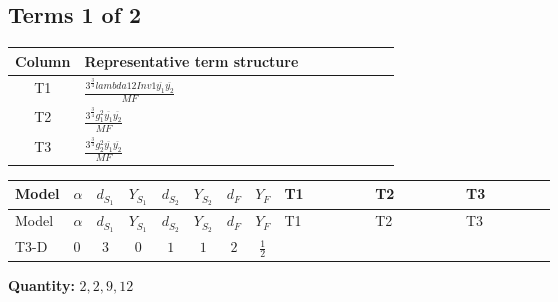 \documentclass[8pt]{article}
\begin{document}
\begin{landscape}
\subsection*{Terms 1 of 2}
\begin{center}
\begin{tabular}{@{}c >{\raggedright\arraybackslash}p{0.82\linewidth}@{}}
\toprule
Column & Representative term structure \\
\midrule
T1 & \(\displaystyle \frac{3^{\frac{3}{4}} lambda12Inv1 \overline{y_{1}} \overline{y_{2}}}{MF}\) \\
\midrule
T2 & \(\displaystyle \frac{3^{\frac{3}{4}} g_{1}^{2} \overline{y_{1}} \overline{y_{2}}}{MF}\) \\
\midrule
T3 & \(\displaystyle \frac{3^{\frac{3}{4}} g_{2}^{2} \overline{y_{1}} \overline{y_{2}}}{MF}\) \\
\midrule
\bottomrule
\end{tabular}
\end{center}
\smallskip
\tiny
\begin{longtable}{@{}llcccccc >{\raggedright\arraybackslash}p{0.21\linewidth} >{\raggedright\arraybackslash}p{0.21\linewidth} >{\raggedright\arraybackslash}p{0.21\linewidth}@{}}
\toprule
Model & $\alpha$ & $d_{S_1}$ & $Y_{S_1}$ & $d_{S_2}$ & $Y_{S_2}$ & $d_F$ & $Y_F$ & T1 & T2 & T3 \\
\midrule
\endfirsthead
\toprule
Model & $\alpha$ & $d_{S_1}$ & $Y_{S_1}$ & $d_{S_2}$ & $Y_{S_2}$ & $d_F$ & $Y_F$ & T1 & T2 & T3 \\
\midrule
\endhead
T3-D & $0$ & $3$ & $0$ & $1$ & $1$ & $2$ & $\frac{1}{2}$ & \scriptsize\adjustbox{max width=\linewidth}{$\begin{gathered} \frac{3^{\frac{3}{4}} lambda12Inv1 \overline{y_{1}} \overline{y_{2}}}{6 MF}\end{gathered}$} & \scriptsize\adjustbox{max width=\linewidth}{$\begin{gathered} \frac{3^{\frac{3}{4}} g_{1}^{2} \overline{y_{1}} \overline{y_{2}}}{8 MF}\end{gathered}$} & \scriptsize\adjustbox{max width=\linewidth}{$\begin{gathered} \frac{17 \cdot 3^{\frac{3}{4}} g_{2}^{2} \overline{y_{1}} \overline{y_{2}}}{24 MF}\end{gathered}$} \\
\midrule
\bottomrule
\end{longtable}
\clearpage
\noindent\textbf{Quantity: }$\mathrm{2,2,9,12}$\par\smallskip

\end{landscape}
\end{document}
